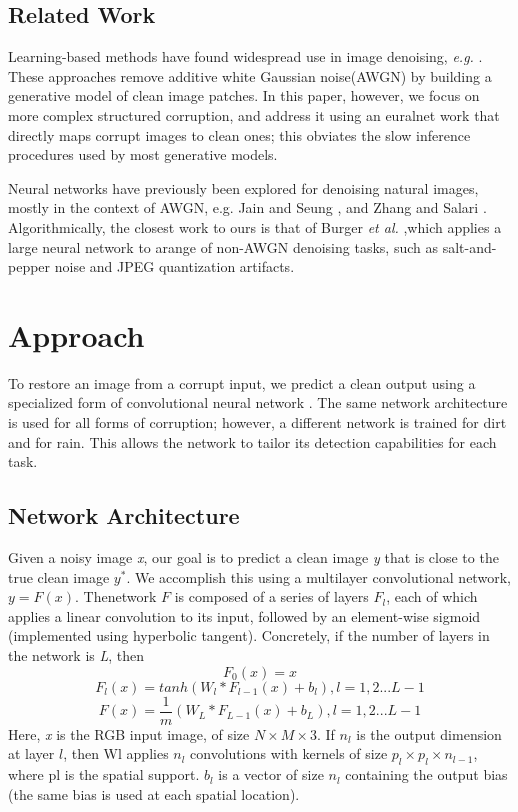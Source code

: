 \documentclass[10pt,twocolumn,letterpaper]{article}
\begin{document}
\subsection{Related Work}
Learning-based methods have found widespread use in image denoising, \emph{e.g.} \cite{Space1997,Prior1997}. These approaches remove additive white Gaussian noise(AWGN) by building a generative model of clean image patches. In this paper, however, we focus on more complex structured corruption, and address it using an euralnet work that directly maps corrupt images to clean ones; this obviates the slow inference procedures used by most generative models.
\par
Neural networks have previously been explored for denoising natural images, mostly in the context of AWGN, e.g. Jain and Seung \cite{Natural2008}, and Zhang and Salari . Algorithmically, the closest work to ours is that of Burger \emph{et al.} \cite{Image2012},which applies a large neural network to arange of non-AWGN denoising tasks, such as salt-and-pepper noise and JPEG quantization artifacts.
\section{Approach}
To restore an image from a corrupt input, we predict a clean output using a specialized form of convolutional neural network . The same network architecture is used for all forms of corruption; however, a different network is trained for dirt and for rain. This allows the network to tailor its detection capabilities for each task.
\subsection{Network Architecture}
Given a noisy image \emph{x}, our goal is to predict a clean image \emph{y} that is close to the true clean image $y^{\ast}$. We accomplish this using a multilayer convolutional network, $y=F\left(x\right)$. Thenetwork $F$ is composed of a series of layers $F_l$, each of which applies a linear convolution to its input, followed by an element-wise sigmoid (implemented using hyperbolic tangent). Concretely, if the number of layers in the network is \emph{L}, then
\begin{equation}
F_0 \left(x\right)=x
\end{equation}
\begin{equation}
F_l \left(x\right)= tanh\left(W_l \ast F_{l-1}\left(x\right)+b_l \right),l=1,2...L-1
\end{equation}
\begin{equation}
F \left(x\right)= \frac{1}{m}\left(W_L \ast F_{L-1}\left(x\right)+b_L \right),l=1,2...L-1
\end{equation}
Here, \emph{x} is the RGB input image, of size $N \times M \times 3$. If $n_l$ is the output dimension at layer $l$, then Wl applies $n_l$ convolutions with kernels of size $p_l \times p_l \times n_{l-1}$, where pl is the spatial support. $b_l$ is a vector of size $n_l$ containing the output bias (the same bias is used at each spatial location).
{\small


}

 
\end{document}
